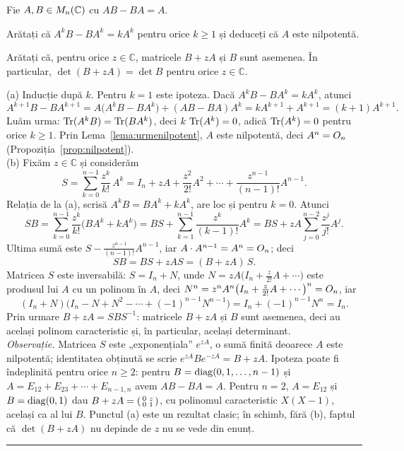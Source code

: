 Fie $A,B\in M_n(\mathbb{C})$ cu $AB-BA=A$.
\begin{parti}
  \item Arătați că $A^kB-BA^k=kA^k$ pentru orice $k\ge1$ și deduceți că $A$ este nilpotentă.
  \item Arătați că, pentru orice $z\in\mathbb{C}$, matricele $B+zA$ și $B$ sunt asemenea. În particular, $\det(B+zA)=\det B$ pentru orice $z\in\mathbb{C}$.
\end{parti}
\sol (a) Inducție după $k$. Pentru $k=1$ este ipoteza. Dacă $A^kB-BA^k=kA^k$, atunci
\[ A^{k+1}B-BA^{k+1}=A\bigl(A^kB-BA^k\bigr)+(AB-BA)A^k=kA^{k+1}+A^{k+1}=(k+1)A^{k+1}. \]
Luăm urma: $\operatorname{Tr}(A^kB)=\operatorname{Tr}(BA^k)$, deci $k\,\operatorname{Tr}(A^k)=0$, adică $\operatorname{Tr}(A^k)=0$ pentru orice $k\ge1$. Prin Lema~\ref{lema:urmenilpotent}, $A$ este nilpotentă, deci $A^n=O_n$ (Propoziția~\ref{prop:nilpotent}).\\[2pt]
(b) Fixăm $z\in\mathbb{C}$ și considerăm
\[ S=\sum_{k=0}^{n-1}\frac{z^k}{k!}\,A^k=I_n+zA+\frac{z^2}{2!}A^2+\cdots+\frac{z^{n-1}}{(n-1)!}A^{n-1}. \]
Relația de la (a), scrisă $A^kB=BA^k+kA^k$, are loc și pentru $k=0$. Atunci
\[ SB=\sum_{k=0}^{n-1}\frac{z^k}{k!}\bigl(BA^k+kA^k\bigr)=BS+\sum_{k=1}^{n-1}\frac{z^k}{(k-1)!}A^k=BS+zA\sum_{j=0}^{n-2}\frac{z^j}{j!}A^j . \]
Ultima sumă este $S-\frac{z^{n-1}}{(n-1)!}A^{n-1}$, iar $A\cdot A^{n-1}=A^n=O_n$; deci
\[ SB=BS+zAS=(B+zA)\,S. \]
Matricea $S$ este inversabilă: $S=I_n+N$, unde $N=zA\bigl(I_n+\frac{z}{2!}A+\cdots\bigr)$ este produsul lui $A$ cu un polinom în $A$, deci $N^n=z^nA^n\bigl(I_n+\frac{z}{2!}A+\cdots\bigr)^n=O_n$, iar
\[ (I_n+N)\bigl(I_n-N+N^2-\cdots+(-1)^{n-1}N^{n-1}\bigr)=I_n+(-1)^{n-1}N^n=I_n. \]
Prin urmare $B+zA=SBS^{-1}$: matricele $B+zA$ și $B$ sunt asemenea, deci au același polinom caracteristic și, în particular, același determinant.\\[2pt]
\emph{Observație.} Matricea $S$ este „exponențiala'' $e^{zA}$, o sumă finită deoarece $A$ este nilpotentă; identitatea obținută se scrie $e^{zA}Be^{-zA}=B+zA$. Ipoteza poate fi îndeplinită pentru orice $n\ge2$: pentru $B=\operatorname{diag}(0,1,\dots,n-1)$ și $A=E_{12}+E_{23}+\cdots+E_{n-1,n}$ avem $AB-BA=A$. Pentru $n=2$, $A=E_{12}$ și $B=\operatorname{diag}(0,1)$ dau $B+zA=\begin{psmallmatrix}0&z\\0&1\end{psmallmatrix}$, cu polinomul caracteristic $X(X-1)$, același ca al lui $B$. Punctul (a) este un rezultat clasic; în schimb, fără (b), faptul că $\det(B+zA)$ nu depinde de $z$ nu se vede din enunț.
\vspace{1mm}\hrule

